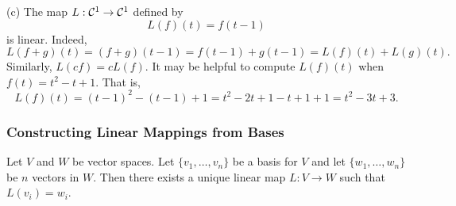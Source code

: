 \documentclass{ximera}
\begin{document}
\noindent (c) The map $L:{\cal C}^1\to{\cal C}^1$ defined by
\[
L(f)(t)=f(t-1)
\]
is linear.  Indeed,
\[
L(f+g)(t) = (f+g)(t-1) = f(t-1) + g(t-1) = L(f)(t) + L(g)(t).
\]
Similarly, $L(cf)=cL(f)$.  It may be helpful to compute $L(f)(t)$ when
$f(t)=t^2-t+1$.  That is,
\[
L(f)(t) = (t-1)^2-(t-1)+1 = t^2-2t+1-t+1+1 = t^2-3t+3.
\]


\subsubsection*{Constructing Linear Mappings from Bases}

\begin{theorem} \label{L:linmapfrombasis}
Let $V$ and $W$ be vector spaces.  Let $\{v_1,\ldots,v_n\}$ be a
basis for $V$ and let $\{w_1,\ldots,w_n\}$ be $n$ vectors in $W$.
Then there exists a unique linear map $L:V\to W$ such that $L(v_i)=w_i$.
\end{theorem}
\end{document}
